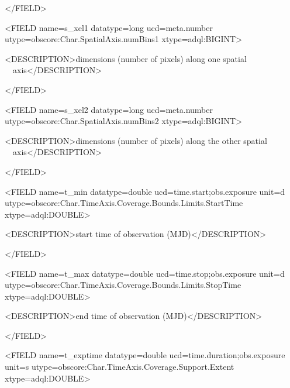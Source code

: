 \documentclass[11pt,a4paper]{ivoa}
\begin{document}
{\textless}/FIELD{\textgreater}

{\textless}FIELD name={\textquotedbl}s\_xel1{\textquotedbl} datatype={\textquotedbl}long{\textquotedbl}
ucd={\textquotedbl}meta.number{\textquotedbl} utype={\textquotedbl}obscore:Char.SpatialAxis.numBins1{\textquotedbl}
xtype={\textquotedbl}adql:BIGINT{\textquotedbl}{\textgreater}

 {\textless}DESCRIPTION{\textgreater}dimensions (number of pixels) along one spatial
\ \ axis{\textless}/DESCRIPTION{\textgreater}

{\textless}/FIELD{\textgreater}

{\textless}FIELD name={\textquotedbl}s\_xel2{\textquotedbl} datatype={\textquotedbl}long{\textquotedbl}
ucd={\textquotedbl}meta.number{\textquotedbl} utype={\textquotedbl}obscore:Char.SpatialAxis.numBins2{\textquotedbl}
xtype={\textquotedbl}adql:BIGINT{\textquotedbl}{\textgreater}

 {\textless}DESCRIPTION{\textgreater}dimensions (number of pixels) along the other spatial
\ \ axis{\textless}/DESCRIPTION{\textgreater}

{\textless}/FIELD{\textgreater}

{\textless}FIELD name={\textquotedbl}t\_min{\textquotedbl} datatype={\textquotedbl}double{\textquotedbl}
ucd={\textquotedbl}time.start;obs.exposure{\textquotedbl} unit={\textquotedbl}d{\textquotedbl}
utype={\textquotedbl}obscore:Char.TimeAxis.Coverage.Bounds.Limits.StartTime{\textquotedbl} 
xtype={\textquotedbl}adql:DOUBLE{\textquotedbl}{\textgreater}

 {\textless}DESCRIPTION{\textgreater}start time of observation (MJD){\textless}/DESCRIPTION{\textgreater}

{\textless}/FIELD{\textgreater}

{\textless}FIELD name={\textquotedbl}t\_max{\textquotedbl} datatype={\textquotedbl}double{\textquotedbl}
ucd={\textquotedbl}time.stop;obs.exposure{\textquotedbl} unit={\textquotedbl}d{\textquotedbl}
utype={\textquotedbl}obscore:Char.TimeAxis.Coverage.Bounds.Limits.StopTime{\textquotedbl}
xtype={\textquotedbl}adql:DOUBLE{\textquotedbl}{\textgreater}

 {\textless}DESCRIPTION{\textgreater}end time of observation (MJD){\textless}/DESCRIPTION{\textgreater}

{\textless}/FIELD{\textgreater}

{\textless}FIELD name={\textquotedbl}t\_exptime{\textquotedbl} datatype={\textquotedbl}double{\textquotedbl}
ucd={\textquotedbl}time.duration;obs.exposure{\textquotedbl} unit={\textquotedbl}s{\textquotedbl}
utype={\textquotedbl}obscore:Char.TimeAxis.Coverage.Support.Extent{\textquotedbl}
xtype={\textquotedbl}adql:DOUBLE{\textquotedbl}{\textgreater}
\end{document}
